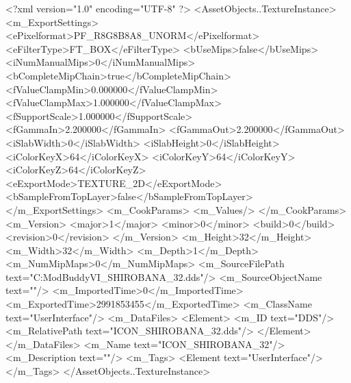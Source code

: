 <?xml version="1.0" encoding="UTF-8" ?>
<AssetObjects..TextureInstance>
	<m_ExportSettings>
		<ePixelformat>PF_R8G8B8A8_UNORM</ePixelformat>
		<eFilterType>FT_BOX</eFilterType>
		<bUseMips>false</bUseMips>
		<iNumManualMips>0</iNumManualMips>
		<bCompleteMipChain>true</bCompleteMipChain>
		<fValueClampMin>0.000000</fValueClampMin>
		<fValueClampMax>1.000000</fValueClampMax>
		<fSupportScale>1.000000</fSupportScale>
		<fGammaIn>2.200000</fGammaIn>
		<fGammaOut>2.200000</fGammaOut>
		<iSlabWidth>0</iSlabWidth>
		<iSlabHeight>0</iSlabHeight>
		<iColorKeyX>64</iColorKeyX>
		<iColorKeyY>64</iColorKeyY>
		<iColorKeyZ>64</iColorKeyZ>
		<eExportMode>TEXTURE_2D</eExportMode>
		<bSampleFromTopLayer>false</bSampleFromTopLayer>
	</m_ExportSettings>
	<m_CookParams>
		<m_Values/>
	</m_CookParams>
	<m_Version>
		<major>1</major>
		<minor>0</minor>
		<build>0</build>
		<revision>0</revision>
	</m_Version>
	<m_Height>32</m_Height>
	<m_Width>32</m_Width>
	<m_Depth>1</m_Depth>
	<m_NumMipMaps>0</m_NumMipMaps>
	<m_SourceFilePath text="C:\Users\asus\Documents\Firaxis ModBuddy\Civilization VI\temppic\ICON_SHIROBANA_32.dds"/>
	<m_SourceObjectName text=""/>
	<m_ImportedTime>0</m_ImportedTime>
	<m_ExportedTime>2991853455</m_ExportedTime>
	<m_ClassName text="UserInterface"/>
	<m_DataFiles>
		<Element>
			<m_ID text="DDS"/>
			<m_RelativePath text="ICON_SHIROBANA_32.dds"/>
		</Element>
	</m_DataFiles>
	<m_Name text="ICON_SHIROBANA_32"/>
	<m_Description text=""/>
	<m_Tags>
		<Element text="UserInterface"/>
	</m_Tags>
</AssetObjects..TextureInstance>

